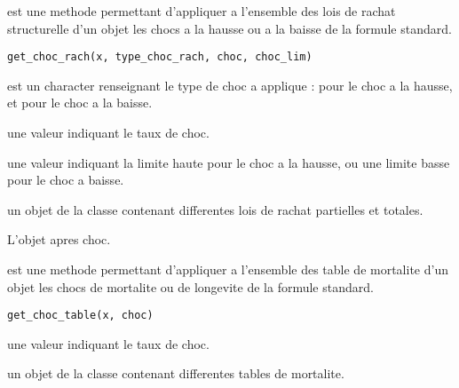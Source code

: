 \documentclass[a4paper]{book}
\begin{document}
%
\begin{Description}\relax
{} est une methode permettant d'appliquer a l'ensemble des lois de rachat
structurelle d'un objet  les chocs a la hausse ou a la baisse de la formule standard.
\end{Description}
%
\begin{Usage}
\begin{verbatim}
get_choc_rach(x, type_choc_rach, choc, choc_lim)
\end{verbatim}
\end{Usage}
%
\begin{Arguments}
\begin{ldescription}
\item[\code{type\_choc\_rach}] est un character renseignant le type de choc a applique : 
pour le choc a la hausse, et  pour le choc a la baisse.

\item[\code{choc}] une valeur  indiquant le taux de choc.

\item[\code{choc\_lim}] une valeur  indiquant la limite haute pour le choc a la hausse,
ou une limite basse pour le choc a baisse.

\item[\code{ht}] un objet de la classe  contenant differentes
lois de rachat partielles et totales.
\end{ldescription}
\end{Arguments}
%
\begin{Value}
L'objet  apres choc.
\end{Value}
%
\begin{Description}\relax
{} est une methode permettant d'appliquer a l'ensemble des table de mortalite
d'un objet  les chocs de mortalite ou de longevite de la formule standard.
\end{Description}
%
\begin{Usage}
\begin{verbatim}
get_choc_table(x, choc)
\end{verbatim}
\end{Usage}
%
\begin{Arguments}
\begin{ldescription}
\item[\code{choc}] une valeur  indiquant le taux de choc.

\item[\code{ht}] un objet de la classe  contenant differentes tables de
mortalite.
\end{ldescription}
\end{Arguments}
\end{document}
